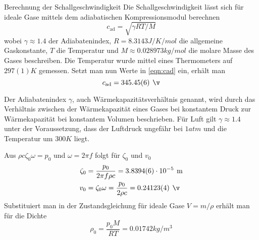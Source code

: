 \documentclass{alex_gp}
\begin{document}
\begin{mybox}{Berechnung der Schallgeschwindigkeit}
	Die Schallgeschwindigkeit lässt sich für ideale Gase mittels dem adiabatischen Kompressionsmodul berechnen 
	\begin{equation}\label{eqn:cad}
		c_{\text{ad}} = \sqrt{\gamma RT/M}
	\end{equation}
	wobei \( \gamma \approx 1.4 \) der Adiabatenindex, \( R = 8.3143 \unit{J/K/mol} \) die allgemeine Gaskonstante, \( T \) die Temperatur und \( M \approx 0.028973 \unit{kg/mol} \) die molare Masse des Gases beschreiben.
	Die Temperatur wurde mittel eines Thermometers auf \( 297(1) \unit{K} \) gemessen. 
	Setzt man nun Werte in \autoref{eqn:cad} ein, erhält man 
	\begin{equation}\label{eqn:cad2}
		c_{\text{ad}} = 345.45(6) \unit{\v}
	\end{equation}
	
	
	
	Der Adiabatenindex \( \gamma \), auch Wärmekapazitätsverhältnis genannt, wird durch das Verhältnis zwischen der Wärmekapazität eines Gases bei konstantem Druck zur Wärmekapazität bei konstantem Volumen beschrieben. 
	Für Luft gilt \( \gamma \approx 1.4 \) unter der Voraussetzung, dass der Luftdruck ungefähr bei \( 1 \unit{atm} \) und die Temperatur um \( 300 \unit{K} \) liegt.
	
	Aus \( 	\rho c \zeta_0 \omega = p_0 \) und \( \omega = 2\pi f \) folgt für \( \zeta_0 \) und \( v_0 \)
	\begin{align}\label{eqn:zeta}
		\zeta_0 &= \frac{p_0}{2\pi f\rho c} = 3.8394(6) \cdot 10^{-5} \unit{m} \\
		v_0 &= \zeta_0\omega = \frac{p_0}{2\rho c} = 0.24123(4) \unit{\v}
	\end{align}
	Substituiert man in der Zustandsgleichung für ideale Gase \( V = m/\rho \) erhält man für die Dichte
	\begin{equation}\label{eqn:density}
		\rho_0 = \frac{p_0M}{RT} = 0.01742 \unit{kg/m^3}
	\end{equation}
\end{mybox}
\end{document}
